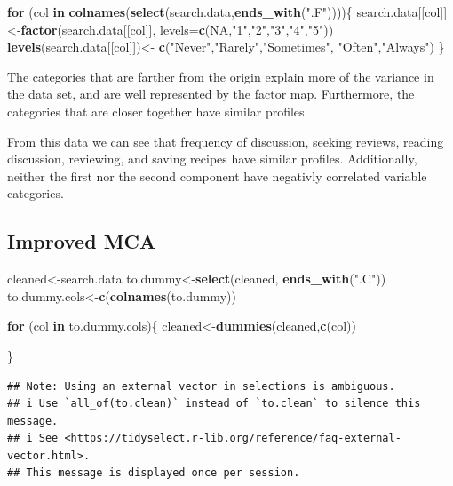 \documentclass[
]{article}
\newenvironment{Shaded}{\begin{snugshade}}{\end{snugshade}}
\newcommand{\ControlFlowTok}[1]{\textcolor[rgb]{0.13,0.29,0.53}{\textbf{#1}}}
\newcommand{\DataTypeTok}[1]{\textcolor[rgb]{0.13,0.29,0.53}{#1}}
\newcommand{\KeywordTok}[1]{\textcolor[rgb]{0.13,0.29,0.53}{\textbf{#1}}}
\newcommand{\NormalTok}[1]{#1}
\newcommand{\OtherTok}[1]{\textcolor[rgb]{0.56,0.35,0.01}{#1}}
\newcommand{\StringTok}[1]{\textcolor[rgb]{0.31,0.60,0.02}{#1}}
\begin{document}
\begin{Shaded}
\begin{Highlighting}[]
\ControlFlowTok{for}\NormalTok{ (col }\ControlFlowTok{in} \KeywordTok{colnames}\NormalTok{(}\KeywordTok{select}\NormalTok{(search.data,}\KeywordTok{ends_with}\NormalTok{(}\StringTok{".F"}\NormalTok{))))\{}
\NormalTok{  search.data[[col]]<-}\KeywordTok{factor}\NormalTok{(search.data[[col]], }\DataTypeTok{levels=}\KeywordTok{c}\NormalTok{(}\OtherTok{NA}\NormalTok{,}\StringTok{"1"}\NormalTok{,}\StringTok{"2"}\NormalTok{,}\StringTok{"3"}\NormalTok{,}\StringTok{"4"}\NormalTok{,}\StringTok{"5"}\NormalTok{))}
  \KeywordTok{levels}\NormalTok{(search.data[[col]])<-}\StringTok{ }\KeywordTok{c}\NormalTok{(}\StringTok{"Never"}\NormalTok{,}\StringTok{"Rarely"}\NormalTok{,}\StringTok{"Sometimes"}\NormalTok{, }\StringTok{"Often"}\NormalTok{,}\StringTok{"Always"}\NormalTok{)}
\NormalTok{\}}
\end{Highlighting}
\end{Shaded}

The categories that are farther from the origin explain more of the
variance in the data set, and are well represented by the factor map.
Furthermore, the categories that are closer together have similar
profiles.

From this data we can see that frequency of discussion, seeking reviews,
reading discussion, reviewing, and saving recipes have similar profiles.
Additionally, neither the first nor the second component have negativly
correlated variable categories.

\hypertarget{improved-mca}{%
\subsection{Improved MCA}\label{improved-mca}}

\begin{Shaded}
\begin{Highlighting}[]
\NormalTok{cleaned<-search.data}
\NormalTok{to.dummy<-}\KeywordTok{select}\NormalTok{(cleaned, }\KeywordTok{ends_with}\NormalTok{(}\StringTok{".C"}\NormalTok{))}
\NormalTok{to.dummy.cols<-}\KeywordTok{c}\NormalTok{(}\KeywordTok{colnames}\NormalTok{(to.dummy))}

\ControlFlowTok{for}\NormalTok{ (col }\ControlFlowTok{in}\NormalTok{ to.dummy.cols)\{}
\NormalTok{   cleaned<-}\KeywordTok{dummies}\NormalTok{(cleaned,}\KeywordTok{c}\NormalTok{(col))}
  
\NormalTok{\}}
\end{Highlighting}
\end{Shaded}

\begin{verbatim}
## Note: Using an external vector in selections is ambiguous.
## i Use `all_of(to.clean)` instead of `to.clean` to silence this message.
## i See <https://tidyselect.r-lib.org/reference/faq-external-vector.html>.
## This message is displayed once per session.
\end{verbatim}
\end{document}
